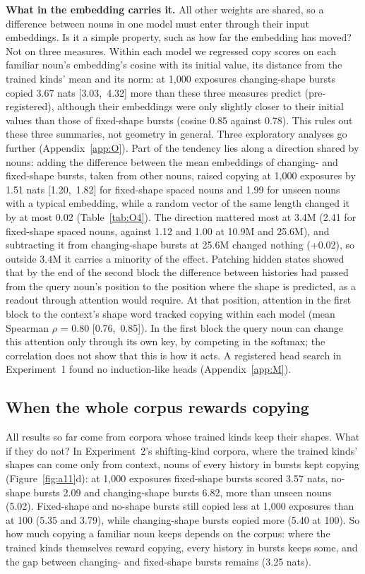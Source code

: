 \documentclass[11pt]{article}
\begin{document}
\textbf{What in the embedding carries it.} All other weights are shared, so a difference between nouns in one model must enter through their input embeddings. Is it a simple property, such as how far the embedding has moved? Not on three measures. Within each model we regressed copy scores on each familiar noun's embedding's cosine with its initial value, its distance from the trained kinds' mean and its norm: at 1,000 exposures changing-shape bursts copied 3.67 nats [3.03,~4.32] more than these three measures predict (pre-registered), although their embeddings were only slightly closer to their initial values than those of fixed-shape bursts (cosine 0.85 against 0.78). This rules out these three summaries, not geometry in general. Three exploratory analyses go further (Appendix~\ref{app:O}). Part of the tendency lies along a direction shared by nouns: adding the difference between the mean embeddings of changing- and fixed-shape bursts, taken from other nouns, raised copying at 1,000 exposures by 1.51 nats [1.20,~1.82] for fixed-shape spaced nouns and 1.99 for unseen nouns with a typical embedding, while a random vector of the same length changed it by at most 0.02 (Table~\ref{tab:O4}). The direction mattered most at 3.4M (2.41 for fixed-shape spaced nouns, against 1.12 and 1.00 at 10.9M and 25.6M), and subtracting it from changing-shape bursts at 25.6M changed nothing (+0.02), so outside 3.4M it carries a minority of the effect. Patching hidden states \citep{zhang2024patching} showed that by the end of the second block the difference between histories had passed from the query noun's position to the position where the shape is predicted, as a readout through attention would require. At that position, attention in the first block to the context's shape word tracked copying within each model (mean Spearman $\rho$ = 0.80 [0.76,~0.85]). In the first block the query noun can change this attention only through its own key, by competing in the softmax; the correlation does not show that this is how it acts. A registered head search in Experiment~1 found no induction-like heads (Appendix~\ref{app:M}).

\subsection{When the whole corpus rewards copying}\label{sec:beyond}
All results so far come from corpora whose trained kinds keep their shapes. What if they do not? In Experiment~2's shifting-kind corpora, where the trained kinds' shapes can come only from context, nouns of every history in bursts kept copying (Figure~\ref{fig:a11}d): at 1,000 exposures fixed-shape bursts scored 3.57 nats, no-shape bursts 2.09 and changing-shape bursts 6.82, more than unseen nouns (5.02). Fixed-shape and no-shape bursts still copied less at 1,000 exposures than at 100 (5.35 and 3.79), while changing-shape bursts copied more (5.40 at 100). So how much copying a familiar noun keeps depends on the corpus: where the trained kinds themselves reward copying, every history in bursts keeps some, and the gap between changing- and fixed-shape bursts remains (3.25 nats).
\end{document}
